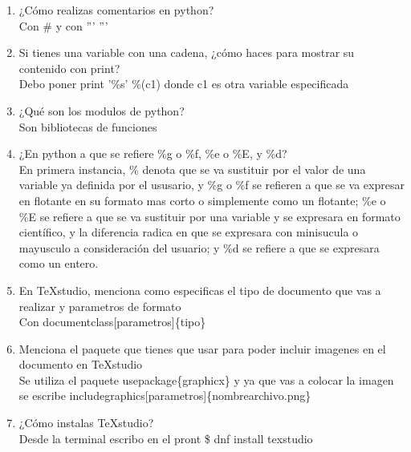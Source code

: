 \documentclass[letterpaper, 12pt, oneside]{article}%
\begin{document}
\begin{enumerate}
	\item ¿Cómo realizas comentarios en python?\\
	Con \# y con '''  '''
	\item Si tienes una variable con una cadena, ¿cómo haces para mostrar su contenido con print?\\
	Debo poner print '\%s' \%(c1) donde c1 es otra variable especificada
	\item ¿Qué son los modulos de python?\\
	Son bibliotecas de funciones
	\item ¿En python a que se refiere \%g o  \%f, \%e o \%E, y \%d?\\
	En primera instancia, \% denota que se va sustituir por el valor de una variable ya definida por el ususario, y \%g o  \%f se refieren a que se va expresar en flotante en su formato mas corto o simplemente como un flotante; \%e o \%E se refiere a que se va sustituir por una variable y se expresara en formato científico, y la diferencia radica en que se expresara con minisucula o mayusculo a consideración del usuario; y \%d se refiere a que se expresara como un entero.
	\item En TeXstudio, menciona como especificas el tipo de documento que vas a realizar y parametros de formato\\
	Con documentclass[parametros]\{tipo\}
	\item Menciona el paquete que tienes que usar para poder incluir imagenes en el documento en TeXstudio\\
	Se utiliza el paquete usepackage\{graphicx\} y ya que vas a colocar la imagen se escribe includegraphics[parametros]\{nombrearchivo.png\}
	\item ¿Cómo instalas TeXstudio?\\
	Desde la terminal escribo en el pront \$ dnf install texstudio
	
	
	
	
\end{enumerate}%
\end{document}
